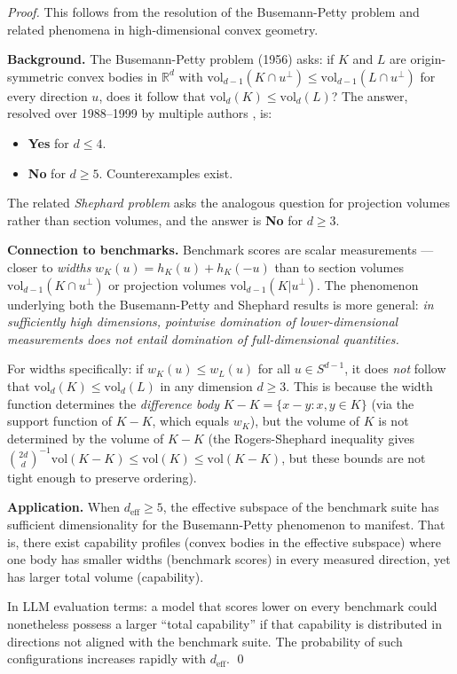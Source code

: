 \begin{proof}
This follows from the resolution of the Busemann-Petty problem and related phenomena in high-dimensional convex geometry.

\textbf{Background.} The Busemann-Petty problem (1956) asks: if $K$ and $L$ are origin-symmetric convex bodies in $\mathbb{R}^d$ with $\mathrm{vol}_{d-1}(K \cap u^\perp) \leq \mathrm{vol}_{d-1}(L \cap u^\perp)$ for every direction $u$, does it follow that $\mathrm{vol}_d(K) \leq \mathrm{vol}_d(L)$? The answer, resolved over 1988--1999 by multiple authors \cite{lutwak1988intersection, gardner1994positive, zhang1999generalized, koldobsky1998intersection}, is:
\begin{itemize}
  \item \textbf{Yes} for $d \leq 4$.
  \item \textbf{No} for $d \geq 5$. Counterexamples exist.
\end{itemize}

The related \emph{Shephard problem} \cite{petty1967projection, schneider1967projections} asks the analogous question for projection volumes rather than section volumes, and the answer is \textbf{No} for $d \geq 3$.

\textbf{Connection to benchmarks.} Benchmark scores are scalar measurements --- closer to \emph{widths} $w_K(u) = h_K(u) + h_K(-u)$ than to section volumes $\mathrm{vol}_{d-1}(K \cap u^\perp)$ or projection volumes $\mathrm{vol}_{d-1}(K | u^\perp)$. The phenomenon underlying both the Busemann-Petty and Shephard results is more general: \emph{in sufficiently high dimensions, pointwise domination of lower-dimensional measurements does not entail domination of full-dimensional quantities.}

For widths specifically: if $w_K(u) \leq w_L(u)$ for all $u \in S^{d-1}$, it does \emph{not} follow that $\mathrm{vol}_d(K) \leq \mathrm{vol}_d(L)$ in any dimension $d \geq 3$. This is because the width function determines the \emph{difference body} $K - K = \{x - y : x, y \in K\}$ (via the support function of $K - K$, which equals $w_K$), but the volume of $K$ is not determined by the volume of $K - K$ (the Rogers-Shephard inequality gives $\binom{2d}{d}^{-1} \mathrm{vol}(K-K) \leq \mathrm{vol}(K) \leq \mathrm{vol}(K-K)$, but these bounds are not tight enough to preserve ordering).

\textbf{Application.} When $d_{\mathrm{eff}} \geq 5$, the effective subspace of the benchmark suite has sufficient dimensionality for the Busemann-Petty phenomenon to manifest. That is, there exist capability profiles (convex bodies in the effective subspace) where one body has smaller widths (benchmark scores) in every measured direction, yet has larger total volume (capability).

In LLM evaluation terms: a model that scores lower on every benchmark could nonetheless possess a larger ``total capability'' if that capability is distributed in directions not aligned with the benchmark suite. The probability of such configurations increases rapidly with $d_{\mathrm{eff}}$. \qed
\end{proof}

